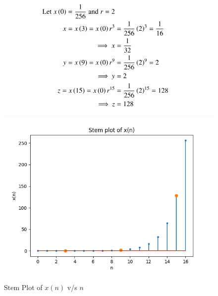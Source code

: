 \documentclass[journal,12pt,twocolumn]{IEEEtran}
\theoremstyle{remark}
\begin{document}
\begin{enumerate}
\begin{align}
    \text{Let}\;x\left(0\right) =\frac{1}{256}\;\text{and}\;r = 2\\      x=x\left(3\right)=x\left(0\right)r^3 &=\frac{1}{256}\left(2\right)^3=\frac{1}{16}\\
     \implies x&=\frac{1}{32} \\
     y=x\left(9\right)=x\left(0\right)r^{9} &=\frac{1}{256}\left(2\right)^{9}=2\\
     \implies y&=2 \\
     z=x\left(15\right)=x\left(0\right)r^{15} &=\frac{1}{256}\left(2\right)^{15}=128\\
    \implies z&=128
\end{align}
\newpage
\begin{figure}[h]
    \renewcommand\thefigure{1}
    \centering
    \caption{Stem Plot of $x(n)$ v/s $n$}
    \includegraphics[width=\columnwidth]{figs/A_1.png}
        \label{fig:1}
\end{figure}


\end{enumerate}
\end{document}
